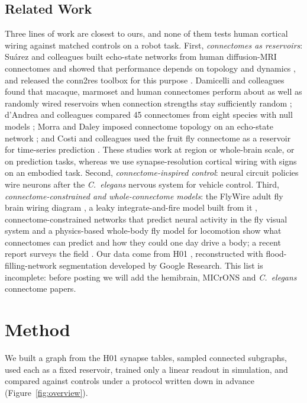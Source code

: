 \documentclass[11pt]{article}
\begin{document}
\subsection{Related Work}
Three lines of work are closest to ours, and none of them tests human cortical wiring against matched controls on a robot task. First, \emph{connectomes as reservoirs}: Suárez and colleagues built echo-state networks from human diffusion-MRI connectomes and showed that performance depends on topology and dynamics \citep{suarez2021learning}, and released the conn2res toolbox for this purpose \citep{suarez2024conn2res}. Damicelli and colleagues found that macaque, marmoset and human connectomes perform about as well as randomly wired reservoirs when connection strengths stay sufficiently random \citep{damicelli2022brain}; d'Andrea and colleagues compared 45 connectomes from eight species with null models \citep{dandrea2022complex}; Morra and Daley imposed connectome topology on an echo-state network \citep{morra2022imposing}; and Costi and colleagues used the fruit fly connectome as a reservoir for time-series prediction \citep{costi2025drosophila}. These studies work at region or whole-brain scale, or on prediction tasks, whereas we use synapse-resolution cortical wiring with signs on an embodied task. Second, \emph{connectome-inspired control}: neural circuit policies \citep{lechner2020ncp} wire neurons after the \emph{C.~elegans} nervous system for vehicle control. Third, \emph{connectome-constrained and whole-connectome models}: the FlyWire adult fly brain wiring diagram \citep{dorkenwald2024flywire}, a leaky integrate-and-fire model built from it \citep{shiu2024fly}, connectome-constrained networks that predict neural activity in the fly visual system \citep{lappalainen2024connectome} and a physics-based whole-body fly model for locomotion \citep{vaxenburg2025whole} show what connectomes can predict and how they could one day drive a body; a recent report surveys the field \citep{brainemulation2025}. Our data come from H01 \citep{shapsoncoe2024h01}, reconstructed with flood-filling-network segmentation \citep{januszewski2018ffn} developed by Google Research. This list is incomplete: before posting we will add the hemibrain, MICrONS and \emph{C.~elegans} connectome papers.

\section{Method}
We built a graph from the H01 synapse tables, sampled connected subgraphs, used each as a fixed reservoir, trained only a linear readout in simulation, and compared against controls under a protocol written down in advance (Figure~\ref{fig:overview}).
\end{document}
